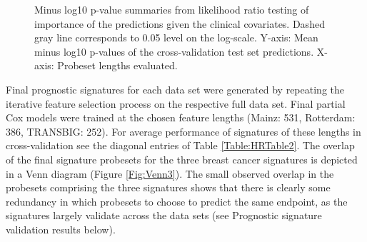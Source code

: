 \documentclass[letterpaper,12pt]{article}
\begin{document}
\begin{figure}[!th]

\centering
{}
\caption{Minus log10 p-value summaries from likelihood ratio testing of importance of the predictions given the clinical covariates. Dashed gray line corresponds to 0.05 level on the log-scale. Y-axis: Mean minus log10 p-values of the cross-validation test set predictions. X-axis: Probeset lengths evaluated.}
\label{Fig:PLSCoxIndep}
\end{figure}


Final prognostic signatures for each data set were generated by repeating the iterative feature selection process on the respective full data set. Final partial Cox models were trained at the chosen feature lengths (Mainz: 531, Rotterdam: 386, TRANSBIG: 252). For average performance of signatures of these lengths in cross-validation see the diagonal entries of Table \ref{Table:HRTable2}. The overlap of the final signature probesets for the three breast cancer signatures is depicted in a Venn diagram (Figure \ref{Fig:Venn3}). The small observed overlap in the probesets comprising the three signatures shows that there is clearly some redundancy in which probesets to choose to predict the same endpoint, as the signatures largely validate across the data sets (see Prognostic signature validation results below). 
\end{document}
